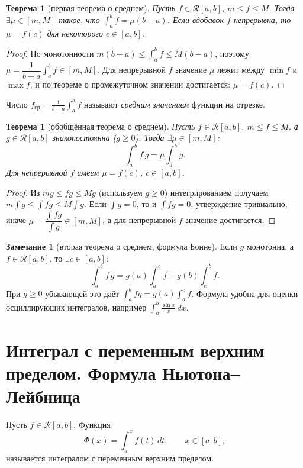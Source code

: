 \documentclass[11pt,a4paper]{article}
\theoremstyle{definition}
\newtheorem{remark}[definition]{Замечание}
\theoremstyle{plain}
\newtheorem{theorem}[definition]{Теорема}
\newcommand{\dx}{\,dx}
\newcommand{\dt}{\,dt}
\renewcommand{\le}{\leqslant}
\renewcommand{\ge}{\geqslant}
\begin{document}
\begin{theorem}[первая теорема о среднем]
Пусть $f\in\mathcal R[a,b]$, $m\le f\le M$. Тогда $\exists\mu\in[m,M]$ такое, что
$\displaystyle\int_a^b f=\mu(b-a)$. Если вдобавок $f$ непрерывна, то $\mu=f(c)$ для некоторого
$c\in[a,b]$.
\end{theorem}

\begin{proof}
По монотонности $m(b-a)\le\int_a^b f\le M(b-a)$, поэтому
$\mu=\dfrac{1}{b-a}\int_a^b f\in[m,M]$. Для непрерывной $f$ значение $\mu$ лежит между $\min f$ и
$\max f$, и по теореме о промежуточном значении достигается: $\mu=f(c)$.
\end{proof}

Число $\displaystyle f_{\text{ср}}=\frac{1}{b-a}\int_a^b f$ называют \emph{средним значением}
функции на отрезке.

\begin{theorem}[обобщённая теорема о среднем]
Пусть $f\in\mathcal R[a,b]$, $m\le f\le M$, а $g\in\mathcal R[a,b]$ знакопостоянна ($g\ge0$).
Тогда $\exists\mu\in[m,M]$:
\[
  \int_a^b f\,g=\mu\!\int_a^b g .
\]
Для непрерывной $f$ имеем $\mu=f(c)$, $c\in[a,b]$.
\end{theorem}

\begin{proof}
Из $mg\le fg\le Mg$ (используем $g\ge0$) интегрированием получаем
$m\int g\le\int fg\le M\int g$. Если $\int g=0$, то и $\int fg=0$, утверждение тривиально; иначе
$\mu=\dfrac{\int fg}{\int g}\in[m,M]$, а для непрерывной $f$ значение достигается.
\end{proof}

\begin{remark}[вторая теорема о среднем, формула Бонне]
Если $g$ монотонна, а $f\in\mathcal R[a,b]$, то $\exists c\in[a,b]$:
\[
  \int_a^b f\,g=g(a)\!\int_a^c f+g(b)\!\int_c^b f .
\]
При $g\ge0$ убывающей это даёт $\int_a^b fg=g(a)\int_a^c f$. Формула удобна для оценки
осциллирующих интегралов, например $\displaystyle\int_a^b\frac{\sin x}{x}\dx$.
\end{remark}

\section{Интеграл с переменным верхним пределом. Формула Ньютона–Лейбница}

Пусть $f\in\mathcal R[a,b]$. Функция
\[
  \Phi(x)=\int_a^x f(t)\dt,\qquad x\in[a,b],
\]
называется интегралом с переменным верхним пределом.
\end{document}
